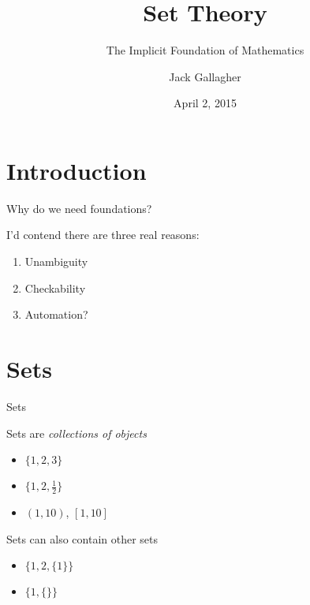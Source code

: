 \documentclass[xcolor=svgnames]{beamer}
\title
  [Set Theory\hspace{2em}]
  {Set Theory}
\subtitle
  {The Implicit Foundation of Mathematics}
\author
  [Jack Gallagher]
  {Jack Gallagher}
\date{April 2, 2015}
\institute{Mentoring Academy}
\begin{document}
\maketitle

\section{Introduction}

\begin{frame}{}
  \begin{center}
  \Huge Why do we need foundations?
  \end{center}
\end{frame}

\begin{frame}{}
    I'd contend there are three real reasons:
    \begin{enumerate}
    \item Unambiguity
    \item Checkability
    \item Automation?
    \end{enumerate}
\end{frame}

\section{Sets}

\begin{frame}{Sets}

    Sets are \emph{collections of objects}

    \begin{itemize}
    \item $\{1,2,3\}$
    \item $\{1,2,\frac{1}{2}\}$
    \item $(1,10)$, $[1,10]$
    \end{itemize} \pause

    Sets can also contain other sets
    
    \begin{itemize}
    \item $\{1,2,\{1\}\}$
    \item $\{1,\{\}\}$
    \end{itemize}

\end{frame}
\end{document}
